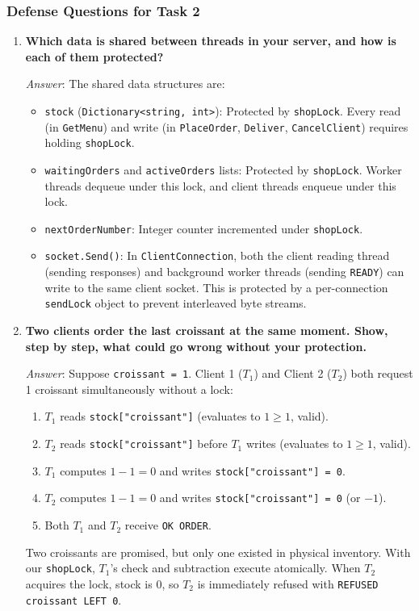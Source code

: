 \documentclass[11pt,a4paper]{article}
\begin{document}
\subsubsection{Defense Questions for Task 2}
\begin{enumerate}[label=\textbf{Q\arabic*.},leftmargin=*]
    \item \textbf{Which data is shared between threads in your server, and how is each of them protected?}
    
    \textit{Answer}: The shared data structures are:
    \begin{itemize}
        \item \texttt{stock} (\texttt{Dictionary<string, int>}): Protected by \texttt{shopLock}. Every read (in \texttt{GetMenu}) and write (in \texttt{PlaceOrder}, \texttt{Deliver}, \texttt{CancelClient}) requires holding \texttt{shopLock}.
        \item \texttt{waitingOrders} and \texttt{activeOrders} lists: Protected by \texttt{shopLock}. Worker threads dequeue under this lock, and client threads enqueue under this lock.
        \item \texttt{nextOrderNumber}: Integer counter incremented under \texttt{shopLock}.
        \item \texttt{socket.Send()}: In \texttt{ClientConnection}, both the client reading thread (sending responses) and background worker threads (sending \texttt{READY}) can write to the same client socket. This is protected by a per-connection \texttt{sendLock} object to prevent interleaved byte streams.
    \end{itemize}

    \item \textbf{Two clients order the last croissant at the same moment. Show, step by step, what could go wrong without your protection.}
    
    \textit{Answer}: Suppose \texttt{croissant = 1}. Client 1 ($T_1$) and Client 2 ($T_2$) both request 1 croissant simultaneously without a lock:
    \begin{enumerate}
        \item $T_1$ reads \texttt{stock["croissant"]} (evaluates to $1 \ge 1$, valid).
        \item $T_2$ reads \texttt{stock["croissant"]} before $T_1$ writes (evaluates to $1 \ge 1$, valid).
        \item $T_1$ computes $1 - 1 = 0$ and writes \texttt{stock["croissant"] = 0}.
        \item $T_2$ computes $1 - 1 = 0$ and writes \texttt{stock["croissant"] = 0} (or $-1$).
        \item Both $T_1$ and $T_2$ receive \texttt{OK ORDER}.
    \end{enumerate}
    Two croissants are promised, but only one existed in physical inventory. With our \texttt{shopLock}, $T_1$'s check and subtraction execute atomically. When $T_2$ acquires the lock, stock is 0, so $T_2$ is immediately refused with \texttt{REFUSED croissant LEFT 0}.


\end{enumerate}
\end{document}
